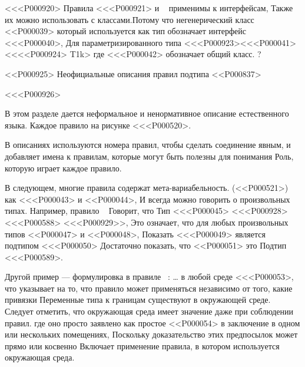 {{{{{<<<P000920>{%
Правила <<<P000921> и ~\SrnSuperinterface
применимы к интерфейсам,
Также их можно использовать с классами.Потому что негенерический класс <<P000039> который используется как тип
обозначает интерфейс <<<P000040>,
Для параметризированного типа
<<<P000923><<<P000041><<<<P000924> T}{1}{k}>
где <<<P000042> обозначает общий класс.%
?


<<P000925> Неофициальные описания правил подтипа
<<P000837>

<<<P000926>{%
В этом разделе дается неформальное и ненормативное описание естественного языка.
Каждое правило на рисунке <<<P000520>.

В описаниях используются номера правил, чтобы сделать соединение явным,
и добавляет имена к правилам, которые могут быть полезны для понимания
Роль, которую играет каждое правило.

В следующем, многие правила содержат мета-вариабельность.
(<<P000521>)
как <<<P000043> и <<P000044>,
И всегда можно говорить о произвольных типах.
Например, правило ~\SrnRightFutureOrA{} Говорит, что
Тип <<<P000045> <<<P000928><<<P000588> <<<P000929>>,
Это означает, что для любых произвольных типов <<P000047> и <<P000048>,
Показать <<<P000049> является подтипом <<<P000050> Достаточно показать, что <<P000051> это
Подтип <<<P000589>.

Другой пример — формулировка в правиле ~\SrnReflexivity{}:
\ldots{} в любой среде <<<P000053>,
что указывает на то, что правило может применяться независимо от того, какие привязки
Переменные типа к границам существуют в окружающей среде.
Следует отметить, что окружающая среда имеет значение даже при соблюдении правил.
где оно просто заявлено как простое <<P000054> в заключение
в одном или нескольких помещениях,
Поскольку доказательство этих предпосылок может прямо или косвенно
Включает применение правила, в котором используется окружающая среда.

}}}}}}
